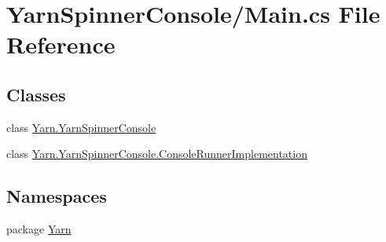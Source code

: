 \hypertarget{a00131}{\section{Yarn\-Spinner\-Console/\-Main.cs File Reference}
\label{a00131}
}
\subsection*{Classes}
\begin{DoxyCompactItemize}
\item 
class \hyperlink{a00092}{Yarn.\-Yarn\-Spinner\-Console}
\item 
class \hyperlink{a00030}{Yarn.\-Yarn\-Spinner\-Console.\-Console\-Runner\-Implementation}
\end{DoxyCompactItemize}
\subsection*{Namespaces}
\begin{DoxyCompactItemize}
\item 
package \hyperlink{a00026}{Yarn}
\end{DoxyCompactItemize}
